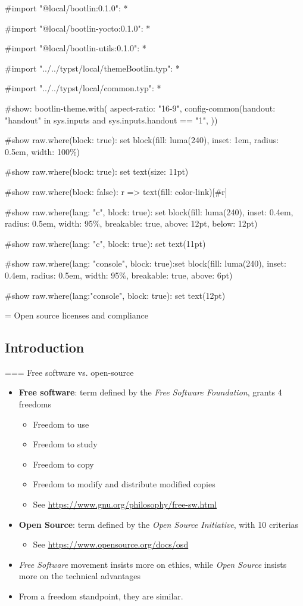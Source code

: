 #import "@local/bootlin:0.1.0": *

#import "@local/bootlin-yocto:0.1.0": *

#import "@local/bootlin-utils:0.1.0": *

#import "../../typst/local/themeBootlin.typ": *

#import "../../typst/local/common.typ": *

#show: bootlin-theme.with( aspect-ratio: "16-9", config-common(handout: "handout" in sys.inputs and sys.inputs.handout == "1", ))

#show raw.where(block: true): set block(fill: luma(240), inset: 1em, radius: 0.5em, width: 100\%)

#show raw.where(block: true): set text(size: 11pt)

#show raw.where(block: false): r => text(fill: color-link)[#r]

#show raw.where(lang: "c", block: true): set block(fill: luma(240), inset: 0.4em, radius: 0.5em, width: 95\%, breakable: true, above: 12pt, below: 12pt)

#show raw.where(lang: "c", block: true): set text(11pt)

#show raw.where(lang: "console", block: true):set block(fill: luma(240), inset: 0.4em, radius: 0.5em, width: 95\%, breakable: true, above: 6pt)

#show raw.where(lang:"console", block: true): set text(12pt)

 = Open source licenses and compliance

\subsection{Introduction}

=== {Free software vs. open-source}
  \begin{itemize}
  \item {\bf Free software}: term defined by the {\em Free Software
      Foundation}, grants 4 freedoms
    \begin{itemize}
    \item Freedom to use
    \item Freedom to study
    \item Freedom to copy
    \item Freedom to modify and distribute modified copies
    \item See \url{https://www.gnu.org/philosophy/free-sw.html}
    \end{itemize}
  \item {\bf Open Source}: term defined by the {\em Open Source
      Initiative}, with 10 criterias
    \begin{itemize}
    \item See \url{https://www.opensource.org/docs/osd}
    \end{itemize}
  \item {\em Free Software} movement insists more on ethics, while
    {\em Open Source} insists more on the technical advantages
  \item From a freedom standpoint, they are similar.
  \end{itemize}


